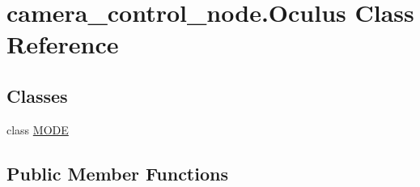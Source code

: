 \hypertarget{classcamera__control__node_1_1Oculus}{\section{camera\-\_\-control\-\_\-node.\-Oculus Class Reference}
\label{classcamera__control__node_1_1Oculus}
}
\subsection*{Classes}
\begin{DoxyCompactItemize}
\item 
class \hyperlink{classcamera__control__node_1_1Oculus_1_1MODE}{M\-O\-D\-E}
\end{DoxyCompactItemize}
\subsection*{Public Member Functions}
